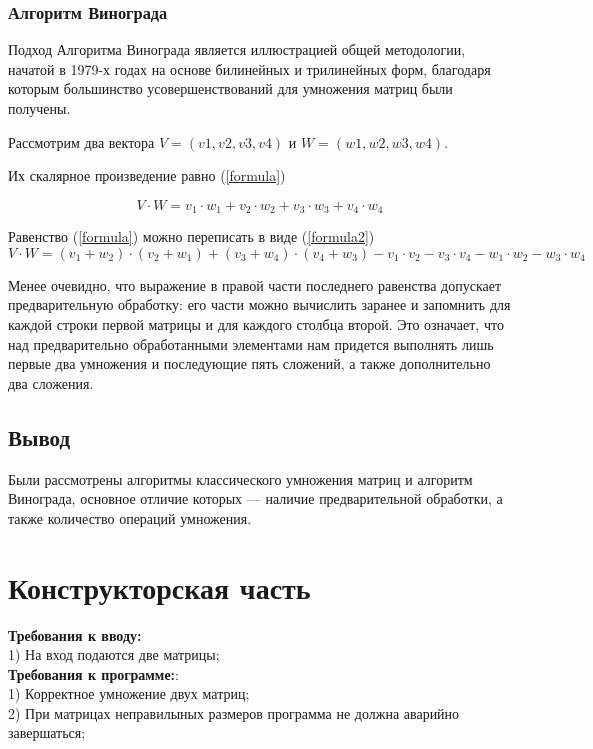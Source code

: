 \documentclass[12pt,a4paper]{article}
\begin{document}
\subsubsection{Алгоритм Винограда}
Подход Алгоритма Винограда является иллюстрацией общей методологии, начатой в 1979-х годах на основе
билинейных и трилинейных форм, благодаря которым большинство усовершенствований для умножения матриц были получены.

Рассмотрим два вектора $V = (v1, v2, v3, v4)$ и $W = (w1, w2, w3, w4)$.  

Их скалярное произведение равно (\ref{formula}) 

\begin{equation} \label{formula}
V \cdot W=v_1 \cdot w_1 + v_2 \cdot w_2 + v_3 \cdot w_3 + v_4 \cdot w_4
\end{equation}

Равенство (\ref{formula}) можно переписать в виде (\ref{formula2}) 
\begin{equation} \label{formula2}
V \cdot W=(v_1 + w_2) \cdot (v_2 + w_1) + (v_3 + w_4) \cdot (v_4 + w_3) - v_1 \cdot v_2 - v_3 \cdot v_4 - w_1 \cdot w_2 - w_3 \cdot w_4
\end{equation}

Менее очевидно, что выражение в правой части последнего равенства допускает предварительную обработку: его части можно вычислить заранее и запомнить для каждой строки первой матрицы и для каждого столбца второй. 
Это означает, что над предварительно обработанными элементами нам придется выполнять лишь первые два умножения и последующие пять сложений, а также дополнительно два сложения.

\subsection{Вывод}
Были рассмотрены алгоритмы классического умножения матриц и алгоритм Винограда, основное отличие которых — наличие предварительной обработки, а также количество операций умножения.
\clearpage

\section{Конструкторская часть}
\textbf{Требования к вводу:}\\
1) На вход подаются две матрицы;\\
\textbf{Требования к программе:}:\\
1) Корректное умножение двух матриц;\\
2) При матрицах неправилыных размеров программа не должна аварийно завершаться;\\
\clearpage
\end{document}
